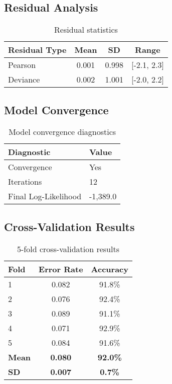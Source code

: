 \documentclass[11pt]{article}
\begin{document}
\subsection{Residual Analysis}

\begin{table}[h]
\centering
\begin{tabular}{lccc}
\toprule
\textbf{Residual Type} & \textbf{Mean} & \textbf{SD} & \textbf{Range} \\
\midrule
Pearson & 0.001 & 0.998 & [-2.1, 2.3] \\
Deviance & 0.002 & 1.001 & [-2.0, 2.2] \\
\bottomrule
\end{tabular}
\caption{Residual statistics}
\end{table}

\subsection{Model Convergence}

\begin{table}[h]
\centering
\begin{tabular}{ll}
\toprule
\textbf{Diagnostic} & \textbf{Value} \\
\midrule
Convergence & Yes \\
Iterations & 12 \\
Final Log-Likelihood & -1,389.0 \\
\bottomrule
\end{tabular}
\caption{Model convergence diagnostics}
\end{table}

\subsection{Cross-Validation Results}

\begin{table}[h]
\centering
\begin{tabular}{lcc}
\toprule
\textbf{Fold} & \textbf{Error Rate} & \textbf{Accuracy} \\
\midrule
1 & 0.082 & 91.8\% \\
2 & 0.076 & 92.4\% \\
3 & 0.089 & 91.1\% \\
4 & 0.071 & 92.9\% \\
5 & 0.084 & 91.6\% \\
\midrule
\textbf{Mean} & \textbf{0.080} & \textbf{92.0\%} \\
\textbf{SD} & \textbf{0.007} & \textbf{0.7\%} \\
\bottomrule
\end{tabular}
\caption{5-fold cross-validation results}
\end{table}
\end{document}
